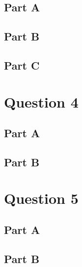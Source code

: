 \documentclass[letterpaper]{article}
\begin{document}
\subsection*{Part A}

\subsection*{Part B}

\subsection*{Part C}

\newpage

\section*{Question 4}

\subsection*{Part A}

\subsection*{Part B}

\newpage

\section*{Question 5}

\subsection*{Part A}

\subsection*{Part B}
\end{document}
